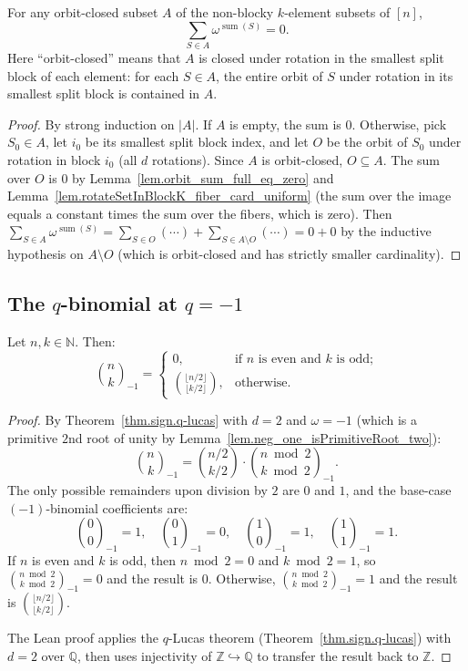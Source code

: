 \begin{lemma}
\label{lem.sum_nonBlocky_subset_eq_zero}
For any orbit-closed subset $A$ of the non-blocky $k$-element subsets
of $[n]$,
\[
\sum_{S \in A} \omega^{\operatorname{sum}(S)} = 0.
\]
Here ``orbit-closed'' means that $A$ is closed under rotation in the
smallest split block of each element: for each $S \in A$, the entire
orbit of $S$ under rotation in its smallest split block is contained
in $A$.
\end{lemma}

\begin{proof}
By strong induction on $|A|$. If $A$ is empty, the sum is $0$.
Otherwise, pick $S_0 \in A$, let $i_0$ be its smallest split block
index, and let $O$ be the orbit of $S_0$ under rotation in block
$i_0$ (all $d$ rotations). Since $A$ is orbit-closed, $O \subseteq A$.
The sum over $O$ is $0$ by
Lemma~\ref{lem.orbit_sum_full_eq_zero} and
Lemma~\ref{lem.rotateSetInBlockK_fiber_card_uniform}
(the sum over the image equals a constant times the sum over the
fibers, which is zero). Then
$\sum_{S \in A} \omega^{\operatorname{sum}(S)} = \sum_{S \in O}(\cdots) + \sum_{S \in A \setminus O}(\cdots) = 0 + 0$
by the inductive hypothesis on $A \setminus O$ (which is orbit-closed
and has strictly smaller cardinality).
\end{proof}

\subsection{The \texorpdfstring{$q$}{q}-binomial at \texorpdfstring{$q = -1$}{q = -1}}

\begin{theorem}
\label{thm.qBinom_neg_one}
\leanhelper
\leanok
Let $n, k \in \mathbb{N}$. Then:
\[
\binom{n}{k}_{-1} =
\begin{cases}
0, & \text{if } n \text{ is even and } k \text{ is odd;} \\
\binom{\lfloor n/2 \rfloor}{\lfloor k/2 \rfloor}, & \text{otherwise.}
\end{cases}
\]
\end{theorem}

\begin{proof}
By Theorem~\ref{thm.sign.q-lucas} with $d = 2$ and $\omega = -1$
(which is a primitive $2$nd root of unity by
Lemma~\ref{lem.neg_one_isPrimitiveRoot_two}):
\[
\binom{n}{k}_{-1}
= \binom{n/2}{k/2} \cdot \binom{n \bmod 2}{k \bmod 2}_{-1}.
\]
The only possible remainders upon division by $2$ are $0$ and $1$, and
the base-case $(-1)$-binomial coefficients are:
\[
\binom{0}{0}_{-1} = 1, \quad
\binom{0}{1}_{-1} = 0, \quad
\binom{1}{0}_{-1} = 1, \quad
\binom{1}{1}_{-1} = 1.
\]
If $n$ is even and $k$ is odd, then $n \bmod 2 = 0$ and
$k \bmod 2 = 1$, so $\binom{n \bmod 2}{k \bmod 2}_{-1} = 0$ and
the result is $0$. Otherwise,
$\binom{n \bmod 2}{k \bmod 2}_{-1} = 1$ and the result is
$\binom{\lfloor n/2 \rfloor}{\lfloor k/2 \rfloor}$.

The Lean proof applies the $q$-Lucas theorem (Theorem~\ref{thm.sign.q-lucas})
with $d = 2$ over $\mathbb{Q}$, then uses injectivity of
$\mathbb{Z} \hookrightarrow \mathbb{Q}$ to transfer the result back
to $\mathbb{Z}$.
\end{proof}
